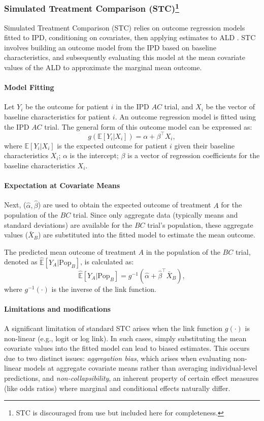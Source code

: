 \documentclass[article]{jss}
\begin{document}
\subsubsection[Simulated Treatment Comparison (STC)]{Simulated Treatment Comparison (STC)\footnote{STC is discouraged from use but included here for completeness.}}
Simulated Treatment Comparison (STC) relies on outcome regression models fitted to IPD, conditioning on covariates, then applying estimates to ALD \citep{caro2010, ishak2015}. STC involves building an outcome model from the IPD based on baseline characteristics, and subsequently evaluating this model at the mean covariate values of the ALD to approximate the marginal mean outcome.

\paragraph{Model Fitting}
Let $Y_i$ be the outcome for patient $i$ in the IPD $AC$ trial, and $X_i$ be the vector of baseline characteristics for patient $i$. An outcome regression model is fitted using the IPD $AC$ trial. The general form of this outcome model can be expressed as:
$$ 
g(\mathbb{E}[Y_i | X_i]) = \alpha + \beta^\top X_i,
$$
where $\mathbb{E}[Y_i | X_i]$ is the expected outcome for patient $i$ given their baseline characteristics $X_i$; $\alpha$ is the intercept; $\beta$ is a vector of regression coefficients for the baseline characteristics $X_i$.

\paragraph{Expectation at Covariate Means}
Next, ($\hat{\alpha}, \hat{\beta}$) are used to obtain the expected outcome of treatment $A$ for the population of the $BC$ trial. Since only aggregate data (typically means and standard deviations) are available for the $BC$ trial's population, these aggregate values ($\bar{X}_B$) are substituted into the fitted model to estimate the mean outcome.

The predicted mean outcome of treatment $A$ in the population of the $BC$ trial, denoted as $\hat{\mathbb{E}}[Y_A | \text{Pop}_B]$, is calculated as:
$$
\hat{\mathbb{E}}[Y_A | \text{Pop}_B] = g^{-1}(\hat{\alpha} + \hat{\beta}^\top \bar{X}_B),
$$
where $g^{-1}(\cdot)$ is the inverse of the link function.

\paragraph{Limitations and modifications}
A significant limitation of standard STC arises when the link function $g(\cdot)$ is non-linear (e.g., logit or log link). In such cases, simply substituting the mean covariate values into the fitted model can lead to biased estimates. This occurs due to two distinct issues: \emph{aggregation bias}, which arises when evaluating non-linear models at aggregate covariate means rather than averaging individual-level predictions, and \emph{non-collapsibility}, an inherent property of certain effect measures (like odds ratios) where marginal and conditional effects naturally differ.
\end{document}
